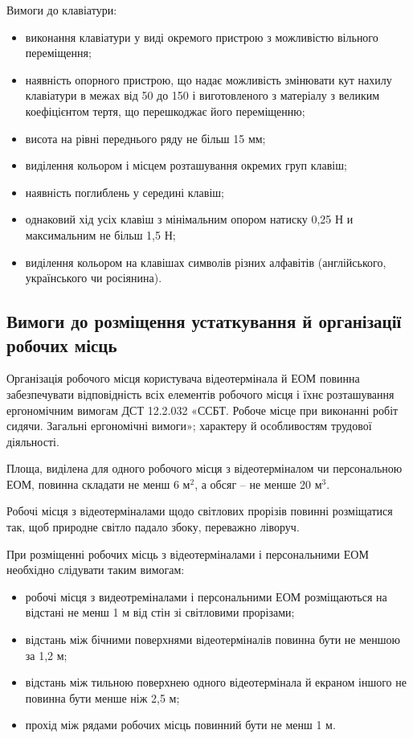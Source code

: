 \documentclass[simple,a4paper,14pt,ukrainian,utf8]{eskdtext}
\begin{document}
\begin{appendices}
                Вимоги до клавіатури:

                \begin{itemize}
                    \item виконання клавіатури у виді окремого пристрою з можливістю вільного переміщення;
                    \item наявність опорного пристрою, що надає можливість змінювати кут нахилу клавіатури в межах від 50 до 150 і виготовленого з матеріалу з великим коефіцієнтом тертя, що перешкоджає його переміщенню;
                    \item висота на рівні переднього ряду не більш 15 мм;
                    \item виділення кольором і місцем розташування окремих груп клавіш;
                    \item наявність поглиблень у середині клавіш;
                    \item однаковий хід усіх клавіш з мінімальним опором натиску 0,25 Н и максимальним не більш 1,5 Н;
                    \item виділення кольором на клавішах символів різних алфавітів (англійського, українського чи росіянина).
                \end{itemize}

            \subsection{Вимоги до розміщення устаткування й організації робочих місць}

                Організація робочого місця користувача відеотермінала й ЕОМ повинна забезпечувати відповідність всіх елементів робочого місця і їхнє розташування ергономічним вимогам ДСТ 12.2.032 «ССБТ. Робоче місце при виконанні робіт сидячи. Загальні ергономічні вимоги»; характеру й особливостям трудової діяльності.

                Площа, виділена для одного робочого місця з відеотерміналом чи персональною ЕОМ, повинна складати не менш 6 м$^{2}$, а обсяг -- не менше 20 м$^{3}$.

                Робочі місця з відеотерміналами щодо світлових прорізів повинні розміщатися так, щоб природне світло падало збоку, переважно ліворуч.

                При розміщенні робочих місць з відеотерміналами і персональними ЕОМ необхідно слідувати таким вимогам:

                \begin{itemize}
                    \item робочі місця з видеотреміналами і персональними ЕОМ розміщаються на відстані не менш 1 м від стін зі світловими прорізами;
                    \item відстань між бічними поверхнями відеотерміналів повинна бути не меншою за 1,2 м;
                    \item відстань між тильною поверхнею одного відеотермінала й екраном іншого не повинна бути менше ніж 2,5 м;
                    \item прохід між рядами робочих місць повинний бути не менш 1 м.
                \end{itemize}


\end{appendices}
\end{document}
